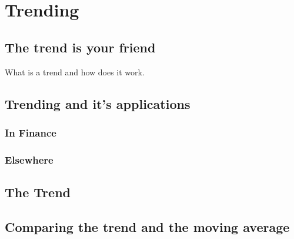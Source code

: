 
\section{Trending}

\subsection{The trend is your friend}
What is a trend and how does it work. 

\subsection{Trending and it's applications}
\subsubsection{In Finance}
\subsubsection{Elsewhere}

\subsection{The Trend}
\subsection{Comparing the trend and the moving average}

